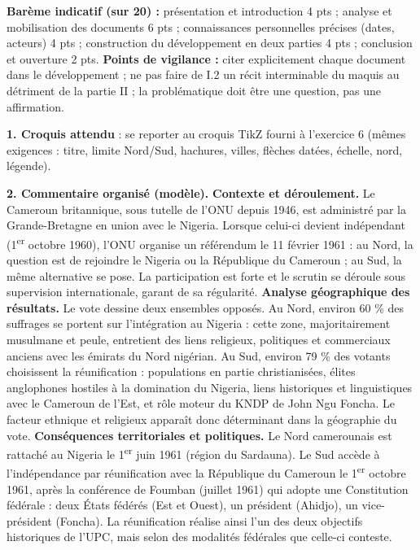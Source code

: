 \documentclass[11pt]{article}
\begin{document}
\begin{corrige}
\textbf{Barème indicatif (sur 20) :} présentation et introduction 4 pts ; analyse et mobilisation des documents 6 pts ; connaissances personnelles précises (dates, acteurs) 4 pts ; construction du développement en deux parties 4 pts ; conclusion et ouverture 2 pts.
\textbf{Points de vigilance :} citer explicitement chaque document dans le développement ; ne pas faire de I.2 un récit interminable du maquis au détriment de la partie II ; la problématique doit être une question, pas une affirmation.
\end{corrige}

\begin{corrige}
\textbf{1. Croquis attendu} : se reporter au croquis TikZ fourni à l'exercice 6 (mêmes exigences : titre, limite Nord/Sud, hachures, villes, flèches datées, échelle, nord, légende).

\textbf{2. Commentaire organisé (modèle).}
\textbf{Contexte et déroulement.} Le Cameroun britannique, sous tutelle de l'ONU depuis 1946, est administré par la Grande-Bretagne en union avec le Nigeria. Lorsque celui-ci devient indépendant (1\textsuperscript{er} octobre 1960), l'ONU organise un référendum le 11 février 1961 : au Nord, la question est de rejoindre le Nigeria ou la République du Cameroun ; au Sud, la même alternative se pose. La participation est forte et le scrutin se déroule sous supervision internationale, garant de sa régularité.
\textbf{Analyse géographique des résultats.} Le vote dessine deux ensembles opposés. Au Nord, environ 60 \% des suffrages se portent sur l'intégration au Nigeria : cette zone, majoritairement musulmane et peule, entretient des liens religieux, politiques et commerciaux anciens avec les émirats du Nord nigérian. Au Sud, environ 79 \% des votants choisissent la réunification : populations en partie christianisées, élites anglophones hostiles à la domination du Nigeria, liens historiques et linguistiques avec le Cameroun de l'Est, et rôle moteur du KNDP de John Ngu Foncha. Le facteur ethnique et religieux apparaît donc déterminant dans la géographie du vote.
\textbf{Conséquences territoriales et politiques.} Le Nord camerounais est rattaché au Nigeria le 1\textsuperscript{er} juin 1961 (région du Sardauna). Le Sud accède à l'indépendance par réunification avec la République du Cameroun le 1\textsuperscript{er} octobre 1961, après la conférence de Foumban (juillet 1961) qui adopte une Constitution fédérale : deux États fédérés (Est et Ouest), un président (Ahidjo), un vice-président (Foncha). La réunification réalise ainsi l'un des deux objectifs historiques de l'UPC, mais selon des modalités fédérales que celle-ci conteste.


\end{corrige}
\end{document}
